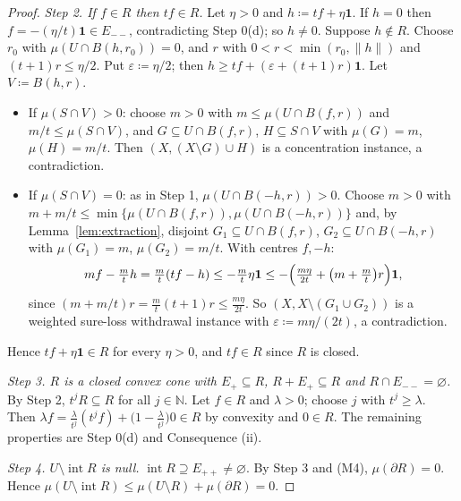 \documentclass[11pt]{article}
\theoremstyle{definition}
\newcommand{\one}{\mathbf 1}
\newcommand{\N}{\mathbb N}
\newcommand{\interior}{\operatorname{int}}
\newcommand{\bd}{\partial}
\begin{document}
\begin{proof}
\emph{Step 2. If $f\in R$ then $tf\in R$.} Let $\eta>0$ and $h\coloneqq tf+\eta\one$. If $h=0$ then $f=-(\eta/t)\one\in E_{--}$, contradicting Step 0(d); so $h\ne0$. Suppose $h\notin R$. Choose $r_0$ with $\mu(U\cap B(h,r_0))=0$, and $r$ with $0<r<\min(r_0,\|h\|)$ and $(t+1)r\le\eta/2$. Put $\varepsilon\coloneqq\eta/2$; then $h\ge tf+(\varepsilon+(t+1)r)\one$. Let $V\coloneqq B(h,r)$.
\begin{itemize}
\item If $\mu(S\cap V)>0$: choose $m>0$ with $m\le\mu(U\cap B(f,r))$ and $m/t\le\mu(S\cap V)$, and $G\subseteq U\cap B(f,r)$, $H\subseteq S\cap V$ with $\mu(G)=m$, $\mu(H)=m/t$. Then $(X,(X\setminus G)\cup H)$ is a concentration instance, a contradiction.
\item If $\mu(S\cap V)=0$: as in Step 1, $\mu(U\cap B(-h,r))>0$. Choose $m>0$ with $m+m/t\le\min\{\mu(U\cap B(f,r)),\mu(U\cap B(-h,r))\}$ and, by Lemma~\ref{lem:extraction}, disjoint $G_1\subseteq U\cap B(f,r)$, $G_2\subseteq U\cap B(-h,r)$ with $\mu(G_1)=m$, $\mu(G_2)=m/t$. With centres $f,-h$:
\[
mf-\tfrac mt h=\tfrac mt(tf-h)\le-\tfrac mt\eta\one\le-\Bigl(\tfrac{m\eta}{2t}+\bigl(m+\tfrac mt\bigr)r\Bigr)\one,
\]
since $(m+m/t)r=\frac mt(t+1)r\le\frac{m\eta}{2t}$. So $(X,X\setminus(G_1\cup G_2))$ is a weighted sure-loss withdrawal instance with $\varepsilon\coloneqq m\eta/(2t)$, a contradiction.
\end{itemize}
Hence $tf+\eta\one\in R$ for every $\eta>0$, and $tf\in R$ since $R$ is closed.

\emph{Step 3. $R$ is a closed convex cone with $E_+\subseteq R$, $R+E_+\subseteq R$ and $R\cap E_{--}=\varnothing$.} By Step 2, $t^jR\subseteq R$ for all $j\in\N$. Let $f\in R$ and $\lambda>0$; choose $j$ with $t^j\ge\lambda$. Then $\lambda f=\frac{\lambda}{t^j}(t^jf)+\bigl(1-\frac{\lambda}{t^j}\bigr)0\in R$ by convexity and $0\in R$. The remaining properties are Step 0(d) and Consequence (ii).

\emph{Step 4. $U\setminus\interior R$ is null.} $\interior R\supseteq E_{++}\ne\varnothing$. By Step 3 and (M4), $\mu(\bd R)=0$. Hence $\mu(U\setminus\interior R)\le\mu(U\setminus R)+\mu(\bd R)=0$.


\end{proof}
\end{document}
